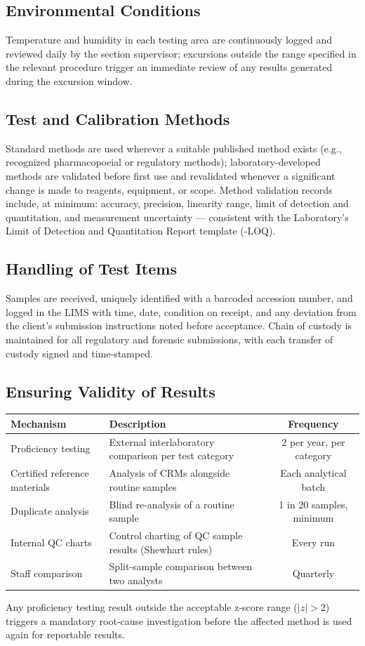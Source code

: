 \subsection{Environmental Conditions}

Temperature and humidity in each testing area are continuously logged and reviewed daily by
the section supervisor; excursions outside the range specified in the relevant procedure
trigger an immediate review of any results generated during the excursion window.

\subsection{Test and Calibration Methods}

Standard methods are used wherever a suitable published method exists (e.g., recognized
pharmacopoeial or regulatory methods); laboratory-developed methods are validated before
first use and revalidated whenever a significant change is made to reagents, equipment, or
scope. Method validation records include, at minimum: accuracy, precision, linearity range,
limit of detection and quantitation, and measurement uncertainty --- consistent with the
Laboratory's Limit of Detection and Quantitation Report template (\doccode-LOQ).

\subsection{Handling of Test Items}

Samples are received, uniquely identified with a barcoded accession number, and logged in
the LIMS with time, date, condition on receipt, and any deviation from the client's
submission instructions noted before acceptance. Chain of custody is maintained for all
regulatory and forensic submissions, with each transfer of custody signed and time-stamped.

\subsection{Ensuring Validity of Results}

\begin{table}[h]
\centering
\small
\renewcommand{\arraystretch}{1.3}
\begin{tabularx}{\linewidth}{@{}l X c@{}}
\toprule
\textbf{Mechanism} & \textbf{Description} & \textbf{Frequency} \\
\midrule
Proficiency testing & External interlaboratory comparison per test category & 2 per year, per category \\
Certified reference materials & Analysis of CRMs alongside routine samples & Each analytical batch \\
Duplicate analysis & Blind re-analysis of a routine sample & 1 in 20 samples, minimum \\
Internal QC charts & Control charting of QC sample results (Shewhart rules) & Every run \\
Staff comparison & Split-sample comparison between two analysts & Quarterly \\
\bottomrule
\end{tabularx}
\end{table}

Any proficiency testing result outside the acceptable z-score range (\(\lvert z \rvert > 2\))
triggers a mandatory root-cause investigation before the affected method is used again for
reportable results.
